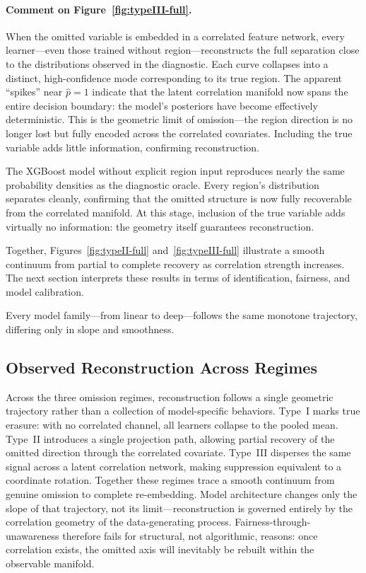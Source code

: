 \documentclass[11pt]{article}
\begin{document}
\paragraph*{Comment on Figure~\ref{fig:typeIII-full}.}
When the omitted variable is embedded in a correlated feature network, every
learner—even those trained without region—reconstructs the full separation
close to the distributions observed in the diagnostic.  Each curve collapses into a distinct,
high-confidence mode corresponding to its true region.  The apparent
``spikes'' near $\hat{p}=1$ indicate that the latent correlation manifold now
spans the entire decision boundary: the model’s posteriors have become
effectively deterministic.  This is the geometric limit of omission—the region
direction is no longer lost but fully encoded across the correlated
covariates.  Including the true variable adds little information, confirming reconstruction.

The XGBoost model without explicit region input reproduces nearly the same
probability densities as the diagnostic oracle.
Every region’s distribution separates cleanly, confirming that
the omitted structure is now fully recoverable from the correlated manifold.
At this stage, inclusion of the true variable adds virtually no information:
the geometry itself guarantees reconstruction.

Together, Figures~\ref{fig:typeII-full} and~\ref{fig:typeIII-full}
illustrate a smooth continuum from partial to complete recovery
as correlation strength increases.
The next section interprets these results in terms of identification,
fairness, and model calibration.

Every model family---from linear to deep---follows the same monotone trajectory, differing only in slope and smoothness.

\subsection{Observed Reconstruction Across Regimes}

Across the three omission regimes, reconstruction follows a single geometric 
trajectory rather than a collection of model-specific behaviors. 
Type~I marks true erasure: with no correlated channel, all learners collapse to the pooled mean. 
Type~II introduces a single projection path, allowing partial recovery of the omitted direction through the correlated covariate. 
Type~III disperses the same signal across a latent correlation network, making suppression equivalent to a coordinate rotation. 
Together these regimes trace a smooth continuum from genuine omission to complete re-embedding. 
Model architecture changes only the slope of that trajectory, not its limit—reconstruction is governed entirely by the correlation geometry of the data-generating process. 
Fairness-through-unawareness therefore fails for structural, not algorithmic, reasons: once correlation exists, the omitted axis will inevitably be rebuilt within the observable manifold.
\end{document}
